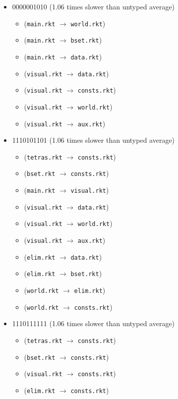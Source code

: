 \documentclass{article}
\newcommand{\mono}[1]{\texttt{#1}}
\begin{document}
\begin{itemize}
\begin{itemize}
  \end{itemize}
\item 0000001010 (1.06 times slower than untyped average)
  \begin{itemize}
  \item (\mono{main.rkt} $\rightarrow$ \mono{world.rkt})
  \item (\mono{main.rkt} $\rightarrow$ \mono{bset.rkt})
  \item (\mono{main.rkt} $\rightarrow$ \mono{data.rkt})
  \item (\mono{visual.rkt} $\rightarrow$ \mono{data.rkt})
  \item (\mono{visual.rkt} $\rightarrow$ \mono{consts.rkt})
  \item (\mono{visual.rkt} $\rightarrow$ \mono{world.rkt})
  \item (\mono{visual.rkt} $\rightarrow$ \mono{aux.rkt})
  \end{itemize}
\item 1110101101 (1.06 times slower than untyped average)
  \begin{itemize}
  \item (\mono{tetras.rkt} $\rightarrow$ \mono{consts.rkt})
  \item (\mono{bset.rkt} $\rightarrow$ \mono{consts.rkt})
  \item (\mono{main.rkt} $\rightarrow$ \mono{visual.rkt})
  \item (\mono{visual.rkt} $\rightarrow$ \mono{data.rkt})
  \item (\mono{visual.rkt} $\rightarrow$ \mono{world.rkt})
  \item (\mono{visual.rkt} $\rightarrow$ \mono{aux.rkt})
  \item (\mono{elim.rkt} $\rightarrow$ \mono{data.rkt})
  \item (\mono{elim.rkt} $\rightarrow$ \mono{bset.rkt})
  \item (\mono{world.rkt} $\rightarrow$ \mono{elim.rkt})
  \item (\mono{world.rkt} $\rightarrow$ \mono{consts.rkt})
  \end{itemize}
\item 1110111111 (1.06 times slower than untyped average)
  \begin{itemize}
  \item (\mono{tetras.rkt} $\rightarrow$ \mono{consts.rkt})
  \item (\mono{bset.rkt} $\rightarrow$ \mono{consts.rkt})
  \item (\mono{visual.rkt} $\rightarrow$ \mono{consts.rkt})
  \item (\mono{elim.rkt} $\rightarrow$ \mono{consts.rkt})

\end{itemize}
\end{itemize}
\end{document}
